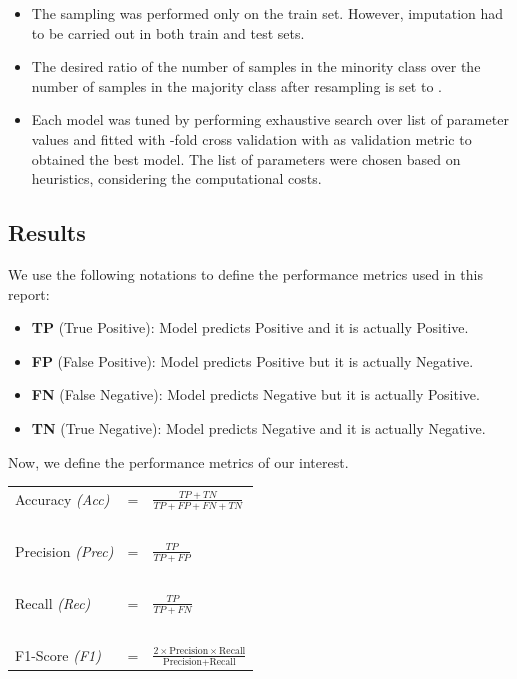 \documentclass[11pt,a4paper]{article}
\begin{document}
\begin{itemize}
    \item The sampling was performed only on the train set. However, imputation had to be carried out in both train and test sets.
    
    \item The desired ratio of the number of samples in the minority class over the number of samples in the majority class after resampling is set to \vasamplingstrategy.
    
    \item Each model was tuned by performing exhaustive search over list of parameter values and fitted with \varcrossval-fold cross validation with \varcrossvalmetric as validation metric to obtained the best model. The list of parameters were chosen based on heuristics, considering the computational costs.
    


\end{itemize}
\subsection{Results}
\label{sec:results}
We use the following notations to define the performance metrics used in this report:
\begin{itemize}
    \item \textbf{TP} (True Positive): Model predicts Positive and it is actually Positive.
    \item \textbf{FP} (False Positive): Model predicts Positive but it is actually Negative.
    \item \textbf{FN} (False Negative): Model predicts Negative but it is actually Positive.
    \item \textbf{TN} (True Negative): Model predicts Negative and it is actually Negative.
\end{itemize}


\noindent Now, we define the performance metrics of our interest.
\begin{table}[htpb]
\centering
\begin{tabular}{lcl}
Accuracy \textit{(Acc)} & = & $\frac{TP + TN}{TP + FP + FN + TN}$ \\
~ & ~ & ~ \\
Precision \textit{(Prec)} & = & $\frac{TP}{TP + FP}$ \\
~ & ~ & ~ \\
Recall \textit{(Rec)} & = & $\frac{TP}{TP + FN}$ \\
~ & ~ & ~ \\
F1-Score \textit{(F1)} & = & $\frac{2 \times \text{Precision} \times
\text{Recall}}{\text{Precision}+\text{Recall}}$ \\
\end{tabular}
\end{table}
\end{document}
